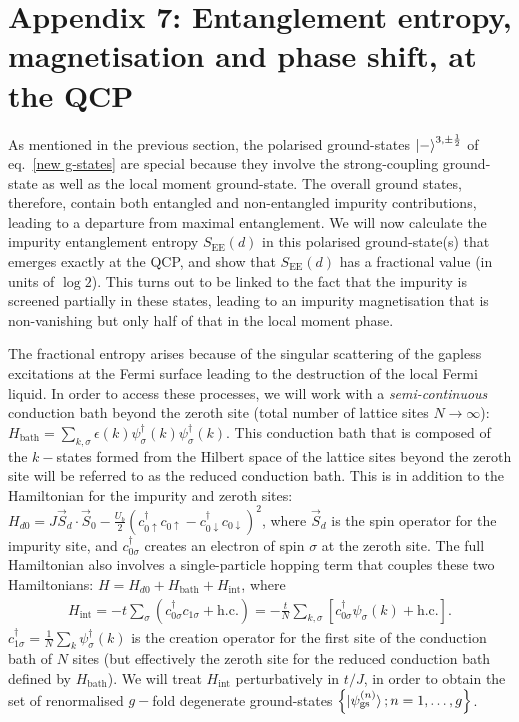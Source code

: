\section*{Appendix 7: Entanglement entropy, magnetisation and phase shift, at the QCP}
As mentioned in the previous section, the polarised ground-states \(\ket{-}^{3,\pm\frac{1}{2}}\) of eq.~\eqref{new g-states} are special because they involve the strong-coupling ground-state as well as the local moment ground-state. The overall ground states, therefore, contain both entangled and non-entangled impurity contributions, leading to a departure from maximal entanglement. We will now calculate the impurity entanglement entropy \(S_\text{EE}(d)\) in this polarised ground-state(s) that emerges exactly at the QCP, and show that \(S_\text{EE}(d)\) has a fractional value (in units of \(\log 2\)). This turns out to be linked to the fact that the impurity is screened partially in these states, leading to an impurity magnetisation that is non-vanishing but only half of that in the local moment phase.

The fractional entropy arises because of the singular scattering of the gapless excitations at the Fermi surface leading to the destruction of the local Fermi liquid. In order to access these processes, we will work with a {\it semi-continuous} conduction bath beyond the zeroth site (total number of lattice sites \(N \to \infty\)): \(H_\text{bath} = \sum_{k,\sigma} \epsilon(k) \psi^\dagger_\sigma(k)\psi^\dagger_\sigma(k)\). This conduction bath that is composed of the \(k-\)states formed from the Hilbert space of the lattice sites beyond the zeroth site will be referred to as the reduced conduction bath. This is in addition to the Hamiltonian for the impurity and zeroth sites: \(H_{d0} = J \vec{S}_d\cdot\vec{S}_0 - \frac{U_b}{2}\left(c_{0\uparrow}^\dagger c_{0\uparrow} - c_{0\downarrow}^\dagger c_{0\downarrow}\right)^2\), where \(\vec S_d\) is the spin operator for the impurity site, and \(c_{0\sigma}^\dagger\) creates an electron of spin \(\sigma\) at the zeroth site. The full Hamiltonian also involves a single-particle hopping term that couples these two Hamiltonians: \(H = H_{d0} + H_\text{bath} + H_\text{int}\), where
\begin{eqnarray}
	H_\text{int} = -t \sum_\sigma\left( c^\dagger_{0 \sigma} c_{1\sigma} + \text{h.c.} \right) = -\frac{t}{N}\sum_{k,\sigma} \left[c^\dagger_{0\sigma} \psi_\sigma(k) + \text{h.c.}\right].
\end{eqnarray}
\(c^\dagger_{1\sigma} = \frac{1}{N}\sum_k \psi^\dagger_\sigma(k)\) is the creation operator for the first site of the conduction bath of \(N\) sites (but effectively the zeroth site for the reduced conduction bath defined by \(H_\text{bath}\)). We will treat \(H_\text{int}\) perturbatively in \(t/J\), in order to obtain the set of renormalised \(g-\)fold degenerate ground-states \(\left\{ \ket{\psi^{(n)}_\text{gs}}; n=1,\ldots,g\right\}\).

